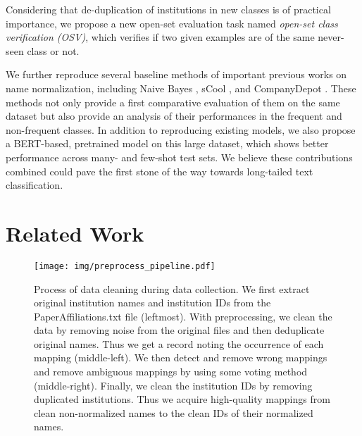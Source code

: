 \documentclass{article}
\begin{document}
Considering that de-duplication of institutions in new classes is of practical importance, we propose a new open-set evaluation task named \textit{open-set class verification (OSV)}, which verifies if two given examples are of the same never-seen class or not. 


We further reproduce several baseline methods of important previous works on name normalization, including Naive Bayes \cite{maron1961automatic}, sCool \cite{jacob2014scool}, and CompanyDepot \cite{liu2016companydepot}. These methods not only provide a first comparative evaluation of them on the same dataset but also provide an analysis of their performances in the frequent and non-frequent classes. 
In addition to reproducing existing models, we also propose a BERT-based, pretrained model on this large dataset, which shows better performance across many- and few-shot test sets.
We believe these contributions combined could pave the first stone of the way towards long-tailed text classification.



\section{Related Work}
\begin{figure*}[!t]
    \centering
    \texttt{[image: img/preprocess\_pipeline.pdf]}
    \caption{Process of data cleaning during data collection. We first extract original institution names and institution IDs from the PaperAffiliations.txt file (leftmost). With preprocessing, we clean the data by removing noise from the original files and then deduplicate original names. Thus we get a record noting the occurrence of each mapping (middle-left). We then detect and remove wrong mappings and remove ambiguous mappings by using some voting method (middle-right). Finally, we clean the institution IDs by removing duplicated institutions. Thus we acquire high-quality mappings from clean non-normalized names to the clean IDs of their normalized names.}
    
    \label{fig:extractdata}
\end{figure*}
\end{document}
